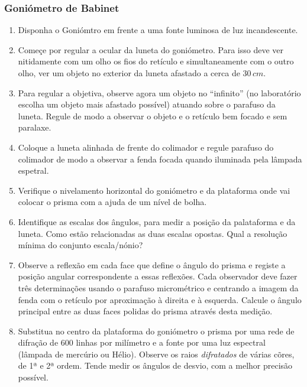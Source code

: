 \documentclass[a4paper,12pt]{article}      %
\begin{document}
\subsubsection{\sf Goniómetro de Babinet}

\begin{enumerate}
\item Disponha o Goniómtro em frente a uma fonte luminosa de luz incandescente.
\item Começe por regular a ocular da luneta do goniómetro. Para isso deve ver nitidamente com um 
olho  os fios do retículo e simultaneamente com o outro olho, ver um objeto no exterior da luneta afastado a cerca de 
$30\,cm$.  
\item Para  regular  a  objetiva,  observe  agora  um  objeto  no  “infinito” (no  laboratório 
escolha  um objeto  mais  afastado possível)  atuando  sobre  o  parafuso  da  luneta.  Regule  de  modo  a 
observar o objeto e o retículo bem focado e sem paralaxe. 
\item Coloque  a  luneta  alinhada de frente  do  colimador  e  regule  parafuso  do 
colimador de modo a observar a fenda focada quando iluminada pela lâmpada espetral. 
\item Verifique o nivelamento horizontal do goniómetro e da plataforma onde vai colocar o prisma com a ajuda de um nível de bolha. 
\item Identifique as escalas dos ângulos, para medir a posição da palataforma e da luneta. Como estão relacionadas as duas escalas opostas. Qual a resolução mínima do conjunto escala/nónio?
\item Observe a reflexão em cada face que define o ângulo do prisma e registe a posição angular 
correspondente a essas reflexões. Cada observador deve fazer três determinações usando o 
parafuso  micrométrico e centrando  a  imagem  da  fenda  com  o retículo  por  aproximação  à direita e à esquerda. Calcule o ângulo principal entre as duas faces polidas do prisma através desta medição.
\item Substitua no centro da plataforma do goniómetro o prisma por uma rede de difração de 
600 linhas por milímetro e a fonte por uma luz espectral (lâmpada de mercúrio ou Hélio). Observe os raios \emph{difratados} de várias cõres, de 1ª e 2ª ordem. Tende medir os ângulos de desvio, com a melhor precisão possível.

\end{enumerate}
\end{document}
